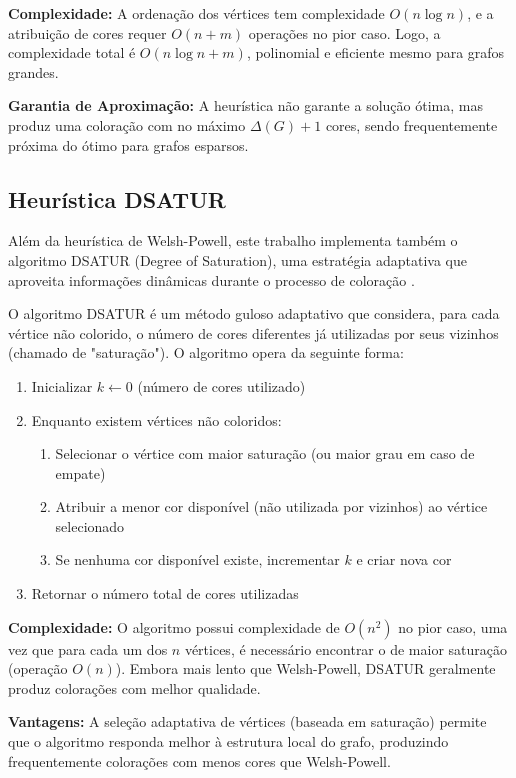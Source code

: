 \documentclass[12pt]{article}
\begin{document}
\textbf{Complexidade:} A ordenação dos vértices tem complexidade $O(n \log n)$, e a atribuição de cores requer $O(n + m)$ operações no pior caso. Logo, a complexidade total é $O(n \log n + m)$, polinomial e eficiente mesmo para grafos grandes.

\textbf{Garantia de Aproximação:} A heurística não garante a solução ótima, mas produz uma coloração com no máximo $\Delta(G) + 1$ cores, sendo frequentemente próxima do ótimo para grafos esparsos.

\subsection{Heurística DSATUR}

Além da heurística de Welsh-Powell, este trabalho implementa também o algoritmo DSATUR (Degree of Saturation), uma estratégia adaptativa que aproveita informações dinâmicas durante o processo de coloração \cite{brelaz1979new}.

O algoritmo DSATUR é um método guloso adaptativo que considera, para cada vértice não colorido, o número de cores diferentes já utilizadas por seus vizinhos (chamado de "saturação"). O algoritmo opera da seguinte forma:

\begin{enumerate}
    \item Inicializar $k \leftarrow 0$ (número de cores utilizado)
    \item Enquanto existem vértices não coloridos:
    \begin{enumerate}
        \item Selecionar o vértice com maior saturação (ou maior grau em caso de empate)
        \item Atribuir a menor cor disponível (não utilizada por vizinhos) ao vértice selecionado
        \item Se nenhuma cor disponível existe, incrementar $k$ e criar nova cor
    \end{enumerate}
    \item Retornar o número total de cores utilizadas
\end{enumerate}

\textbf{Complexidade:} O algoritmo possui complexidade de $O(n^2)$ no pior caso, uma vez que para cada um dos $n$ vértices, é necessário encontrar o de maior saturação (operação $O(n)$). Embora mais lento que Welsh-Powell, DSATUR geralmente produz colorações com melhor qualidade.

\textbf{Vantagens:} A seleção adaptativa de vértices (baseada em saturação) permite que o algoritmo responda melhor à estrutura local do grafo, produzindo frequentemente colorações com menos cores que Welsh-Powell.
\end{document}
